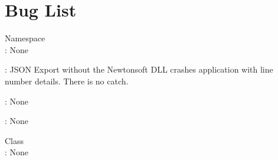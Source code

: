 \chapter{Bug List}
\hypertarget{bug}{}\label{bug}

\begin{DoxyRefList}
\item[Namespace \doxylink{namespace_focus_app}{Focus\+App} ]\hfill \\
\label{bug__bug000001}%
%
\+: None 

\label{bug__bug000002}%
%
\+: JSON Export without the Newtonsoft DLL crashes application with line number details. There is no catch. 

\label{bug__bug000003}%
%
\+: None 

\label{bug__bug000004}%
%
\+: None  
\item[Class \doxylink{class_focus_app_1_1_task_manager}{Focus\+App.Task\+Manager} ]\hfill \\
\label{bug__bug000005}%
%
\+: None 
\end{DoxyRefList}